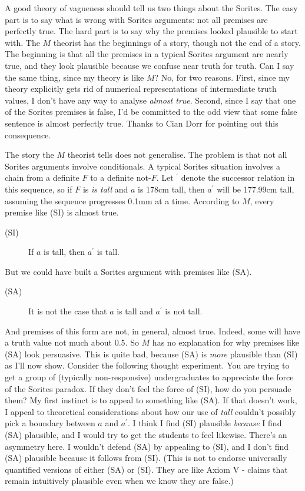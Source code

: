 A good theory of vagueness should tell us two things about the Sorites.
The easy part is to say what is wrong with Sorites arguments: not all
premises are perfectly true. The hard part is to say why the premises
looked plausible to start with. The \(M\) theorist has the beginnings of
a story, though not the end of a story. The beginning is that all the
premises in a typical Sorites argument are nearly true, and they look
plausible because we confuse near truth for truth. Can I say the same
thing, since my theory is like \(M\)? No, for two reasons. First, since
my theory explicitly gets rid of numerical representations of
intermediate truth values, I don't have any way to analyse \emph{almost
true}. Second, since I say that one of the Sorites premises is false,
I'd be committed to the odd view that some false sentence is almost
perfectly true. Thanks to Cian Dorr for pointing out this consequence.

The story the \(M\) theorist tells does not generalise. The problem is
that not all Sorites arguments involve conditionals. A typical Sorites
situation involves a chain from a definite \(F\) to a definite
not-\(F\). Let \(^\prime\) denote the successor relation in this
sequence, so if \(F\) is \emph{is tall} and \(a\) is 178cm tall, then
\(a ^\prime\) will be 177.99cm tall, assuming the sequence progresses
0.1mm at a time. According to \(M\), every premise like (SI) is almost
true.

\begin{description}
\item[(SI)]
If \(a\) is tall, then \(a ^\prime\) is tall.
\end{description}

But we could have built a Sorites argument with premises like (SA).

\begin{description}
\item[(SA)]
It is not the case that \(a\) is tall and \(a ^\prime\) is not tall.
\end{description}

And premises of this form are not, in general, almost true. Indeed, some
will have a truth value not much about 0.5. So \(M\) has no explanation
for why premises like (SA) look persuasive. This is quite bad, because
(SA) is \emph{more} plausible than (SI) as I'll now show. Consider the
following thought experiment. You are trying to get a group of
(typically non-responsive) undergraduates to appreciate the force of the
Sorites paradox. If they don't feel the force of (SI), how do you
persuade them? My first instinct is to appeal to something like (SA). If
that doesn't work, I appeal to theoretical considerations about how our
use of \emph{tall} couldn't possibly pick a boundary between \(a\) and
\(a ^\prime\). I think I find (SI) plausible \emph{because} I find (SA)
plausible, and I would try to get the students to feel likewise. There's
an asymmetry here. I wouldn't defend (SA) by appealing to (SI), and I
don't find (SA) plausible because it follows from (SI). (This is not to
endorse universally quantified versions of either (SA) or (SI). They are
like Axiom V - claims that remain intuitively plausible even when we
know they are false.)

